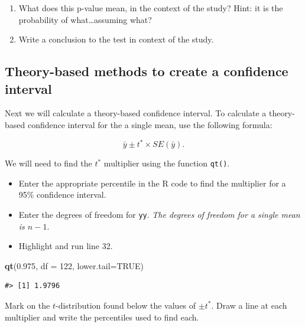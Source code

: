 \documentclass[
]{report}
\newenvironment{Shaded}{\begin{snugshade}}{\end{snugshade}}
\newcommand{\AttributeTok}[1]{\textcolor[rgb]{0.13,0.29,0.53}{#1}}
\newcommand{\ConstantTok}[1]{\textcolor[rgb]{0.56,0.35,0.01}{#1}}
\newcommand{\DecValTok}[1]{\textcolor[rgb]{0.00,0.00,0.81}{#1}}
\newcommand{\FloatTok}[1]{\textcolor[rgb]{0.00,0.00,0.81}{#1}}
\newcommand{\FunctionTok}[1]{\textcolor[rgb]{0.13,0.29,0.53}{\textbf{#1}}}
\newcommand{\NormalTok}[1]{#1}
\begin{document}
\begin{enumerate}
\def\labelenumi{\arabic{enumi}.}
\setcounter{enumi}{4}
\item
  What does this p-value mean, in the context of the study? Hint: it is the probability of what\ldots assuming what?
  \vspace{0.8in}
\item
  Write a conclusion to the test in context of the study.
\end{enumerate}

\vspace{0.6in}

\subsection*{Theory-based methods to create a confidence interval}\label{theory-based-methods-to-create-a-confidence-interval}

Next we will calculate a theory-based confidence interval. To calculate a theory-based confidence interval for the a single mean, use the following formula:

\[\bar{y}\pm t^* \times SE(\bar{y}).\]

We will need to find the \(t^*\) multiplier using the function \texttt{qt()}.

\begin{itemize}
\item
  Enter the appropriate percentile in the R code to find the multiplier for a 95\% confidence interval.
\item
  Enter the degrees of freedom for \texttt{yy}. \emph{The degrees of freedom for a single mean is \(n-1\)}.
\item
  Highlight and run line 32.
\end{itemize}

\begin{Shaded}
\begin{Highlighting}[]
\FunctionTok{qt}\NormalTok{(}\FloatTok{0.975}\NormalTok{, }\AttributeTok{df =} \DecValTok{122}\NormalTok{, }\AttributeTok{lower.tail=}\ConstantTok{TRUE}\NormalTok{)}
\end{Highlighting}
\end{Shaded}

\begin{verbatim}
#> [1] 1.9796
\end{verbatim}

Mark on the \(t\)-distribution found below the values of \(\pm t^*\). Draw a line at each multiplier and write the percentiles used to find each.
\vspace{1mm}
\end{document}
